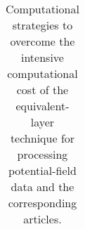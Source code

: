 \begin{table}[h!]
\begin{tabular}{c c c c c}
 		\end{tabular}
	
	\caption{Computational strategies to overcome the intensive computational cost of the
       equivalent-layer technique for processing potential-field data and the corresponding 	
       articles.
	}
	\label{tab:discussion}
\end{table}
